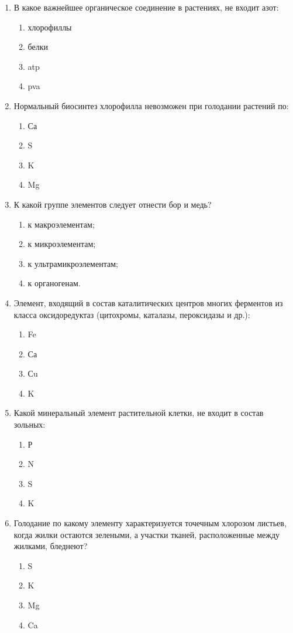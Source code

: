 \begin{enumerate}
\item В какое важнейшее органическое соединение в растениях, не входит азот:
\begin{enumerate}
	\item хлорофиллы       
	\item белки
	\item \gls{atp}                   
	\item \gls{pva}
\end{enumerate}

\item Нормальный биосинтез хлорофилла невозможен при голодании растений по:
\begin{enumerate}
	\item Са          
	\item S
	\item K           
	\item Mg
\end{enumerate}

\item К какой группе элементов следует отнести бор и медь?
\begin{enumerate}
	\item к макроэлементам;             
	\item к микроэлементам; 
	\item к ультрамикроэлементам; 
	\item к органогенам.
\end{enumerate}

\item Элемент, входящий в состав каталитических центров многих ферментов из класса оксидоредуктаз (цитохромы, каталазы, пероксидазы и др.):
\begin{enumerate}
	\item Fe             
	\item Са
	\item Сu           
	\item K
\end{enumerate}

\item Какой минеральный элемент растительной клетки, не входит в состав зольных:
\begin{enumerate}
	\item Р           
	\item N
	\item S           
	\item K
\end{enumerate}

\item Голодание по какому элементу характеризуется точечным хлорозом листьев, когда жилки остаются зелеными, а участки тканей, расположенные между жилками, бледнеют?
\begin{enumerate}
	\item S            
	\item K
	\item Mg       
	\item Ca
\end{enumerate}


\end{enumerate}
